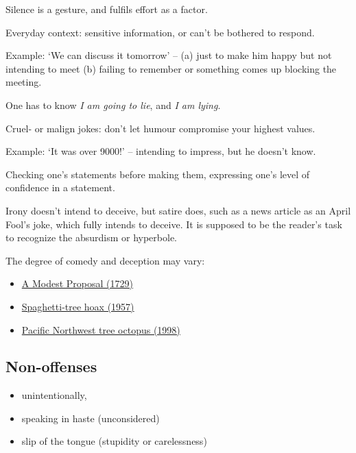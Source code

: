 Silence is a gesture, and fulfils effort as a factor.

Everyday context: sensitive information, or can't be bothered to
respond.

Example: `We can discuss it tomorrow' -- (a) just to make him happy but
not intending to meet (b) failing to remember or something comes up
blocking the meeting.

One has to know \emph{I am going to lie}, and \emph{I am lying}.

\enlargethispage{\baselineskip}
\begin{multicols}{2}

Cruel- or malign jokes: don't let humour compromise your highest values.

Example: `It was over 9000!' -- intending to impress, but he doesn't
know.

Checking one's statements before making them, expressing one's level of
confidence in a statement.

\columnbreak

Irony doesn't intend to deceive, but satire does, such as a news article
as an April Fool's joke, which fully intends to deceive. It is supposed
to be the reader's task to recognize the absurdism or hyperbole.

The degree of comedy and deception may vary:

\begin{itemize}
\tightlist
\item
  \href{https://en.wikipedia.org/wiki/A_Modest_Proposal}{A Modest
  Proposal (1729)}
\item
  \href{https://en.wikipedia.org/wiki/Spaghetti-tree_hoax}{Spaghetti-tree
  hoax (1957)}
\item
  \href{https://en.wikipedia.org/wiki/Pacific_Northwest_tree_octopus}{Pacific
  Northwest tree octopus (1998)}
\end{itemize}

\end{multicols}
\clearpage

\subsection{Non-offenses}

\begin{itemize}
\tightlist
\item
  unintentionally,
\item
  speaking in haste (unconsidered)
\item
  slip of the tongue (stupidity or carelessness)
\end{itemize}

